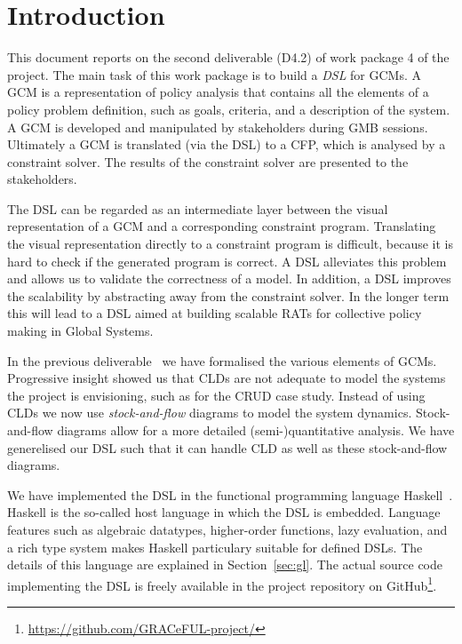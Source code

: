 \section{Introduction}\label{introduction}

This document reports on the second deliverable (D4.2) of work package 4 of the
\grace project. The main task of this work package is to build a \emph{\ac{DSL}}
for \acp{GCM}. A \ac{GCM} is a representation of policy analysis that contains
all the elements of a policy problem definition, such as goals, criteria, and
  a description of the system. A \ac{GCM} is developed and manipulated by
stakeholders during \ac{GMB} sessions. Ultimately a \ac{GCM} is translated
(via the \ac{DSL}) to a \ac{CFP}, which is analysed by a constraint solver. The
results of the constraint solver are presented to the stakeholders.

The \ac{DSL} can be regarded as an intermediate layer between the visual
representation of a \acf{GCM} and a corresponding constraint program.
Translating the visual representation directly to a constraint program is
difficult, because it is hard to check if the generated program is correct. A
DSL alleviates this problem and allows us to validate the correctness of a
model. In addition, a \ac{DSL} improves the scalability by abstracting away from
the constraint solver. In the longer term this will lead to a \ac{DSL} aimed at
building scalable \acp{RAT} for collective policy making in Global Systems.


In the previous deliverable~\cite{D4.1} we have formalised the various elements
of \acp{GCM}. Progressive insight showed us that \acp{CLD} are not adequate to
model the systems the project is envisioning, such as for the \ac{CRUD} case
study. Instead of using \aclp{CLD} we now use \emph{stock-and-flow} diagrams to
model the system dynamics. Stock-and-flow diagrams allow for a more detailed
(semi-)quantitative analysis. We have generelised our DSL such that it can handle
\acl{CLD} as well as these stock-and-flow diagrams.


We have implemented the \acl{DSL} in the functional programming language
Haskell~\cite{haskell98}. Haskell is the so-called host language in which the
\ac{DSL} is embedded. Language features such as algebraic datatypes,
higher-order functions, lazy evaluation, and a rich type system makes Haskell
particulary suitable for defined \acp{DSL}. The details of this language are
explained in Section~\ref{sec:gl}. The actual source code implementing the DSL
is freely available in the project repository on
GitHub\footnote{\url{https://github.com/GRACeFUL-project/}}.

